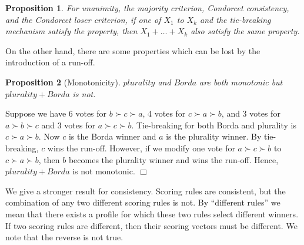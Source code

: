 \documentclass{ecai2012}
\newcommand{\winner}[2]{\mbox{$#1 + #2$}}
\newcommand{\winners}[3]{\mbox{$#1 + #2 + #3$}}
\newtheorem{proposition}{Proposition}
\newcommand{\myproof}{\vspace{-3mm}\noindent {\bf Proof:\ \ }}
\newcommand{\myqed}{\mbox{$\Box$}}
\newcommand\lirong[1]{}
\begin{document}


\begin{proposition}
For unanimity, the majority criterion, Condorcet consistency,
and the Condorcet loser criterion,
if one of $X_1$ to $X_k$ and the tie-breaking
mechanism satisfy the property,
then $\winners{X_1}{\ldots}{X_k}$ also satisfy the same property.
\lirong{I commented out a seemingly duplicated sentence.}
\end{proposition}

On the other hand, there are some properties
which can be lost by the introduction of a run-off.

\begin{proposition}[Monotonicity]
$plurality$ and $Borda$ are both monotonic but
$\winner{plurality}{Borda}$ is not.
\end{proposition}
\myproof
Suppose we have 6 votes for
$b\succ c\succ a$,\lirong{There was a typo ($\prec$ should be $\succ$), which is corrected now.}
4 votes for $c \succ a \succ b$,
and 3 votes for  $a \succ b \succ c$ and 3 votes for
$a \succ c \succ b$.
Tie-breaking for both Borda and plurality is $c \succ a \succ b$.
Now $c$ is the Borda winner and $a$ is the plurality winner.
By tie-breaking, $c$ wins the run-off.
However, if we modify one
vote for $a \succ c \succ b$ to $c \succ a \succ b$,
then $b$ becomes the plurality winner
and wins the run-off.
Hence, $\winner{plurality}{Borda}$ is not
monotonic.
\myqed

We give a stronger %
result for
consistency. Scoring rules are consistent, but
the combination of any two different scoring rules
is not. By ``different rules'' we mean that there exists a profile for which these two rules select different winners. If two scoring rules are different, then their scoring vectors must be different. We note that the reverse is not true.
\end{document}
